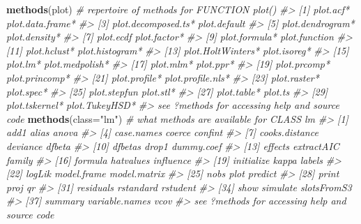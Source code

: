 \documentclass[
]{book}
\newenvironment{Shaded}{\begin{snugshade}}{\end{snugshade}}
\newcommand{\AttributeTok}[1]{\textcolor[rgb]{0.13,0.29,0.53}{#1}}
\newcommand{\CommentTok}[1]{\textcolor[rgb]{0.56,0.35,0.01}{\textit{#1}}}
\newcommand{\FunctionTok}[1]{\textcolor[rgb]{0.13,0.29,0.53}{\textbf{#1}}}
\newcommand{\NormalTok}[1]{#1}
\newcommand{\StringTok}[1]{\textcolor[rgb]{0.31,0.60,0.02}{#1}}
\begin{document}
\begin{Shaded}
\begin{Highlighting}[]
\FunctionTok{methods}\NormalTok{(plot) }\CommentTok{\# repertoire of methods for FUNCTION plot()}
\CommentTok{\#\textgreater{}  [1] plot.acf*           plot.data.frame*   }
\CommentTok{\#\textgreater{}  [3] plot.decomposed.ts* plot.default       }
\CommentTok{\#\textgreater{}  [5] plot.dendrogram*    plot.density*      }
\CommentTok{\#\textgreater{}  [7] plot.ecdf           plot.factor*       }
\CommentTok{\#\textgreater{}  [9] plot.formula*       plot.function      }
\CommentTok{\#\textgreater{} [11] plot.hclust*        plot.histogram*    }
\CommentTok{\#\textgreater{} [13] plot.HoltWinters*   plot.isoreg*       }
\CommentTok{\#\textgreater{} [15] plot.lm*            plot.medpolish*    }
\CommentTok{\#\textgreater{} [17] plot.mlm*           plot.ppr*          }
\CommentTok{\#\textgreater{} [19] plot.prcomp*        plot.princomp*     }
\CommentTok{\#\textgreater{} [21] plot.profile*       plot.profile.nls*  }
\CommentTok{\#\textgreater{} [23] plot.raster*        plot.spec*         }
\CommentTok{\#\textgreater{} [25] plot.stepfun        plot.stl*          }
\CommentTok{\#\textgreater{} [27] plot.table*         plot.ts            }
\CommentTok{\#\textgreater{} [29] plot.tskernel*      plot.TukeyHSD*     }
\CommentTok{\#\textgreater{} see \textquotesingle{}?methods\textquotesingle{} for accessing help and source code}
\FunctionTok{methods}\NormalTok{(}\AttributeTok{class=}\StringTok{"lm"}\NormalTok{)  }\CommentTok{\# what methods are available for CLASS lm}
\CommentTok{\#\textgreater{}  [1] add1           alias          anova         }
\CommentTok{\#\textgreater{}  [4] case.names     coerce         confint       }
\CommentTok{\#\textgreater{}  [7] cooks.distance deviance       dfbeta        }
\CommentTok{\#\textgreater{} [10] dfbetas        drop1          dummy.coef    }
\CommentTok{\#\textgreater{} [13] effects        extractAIC     family        }
\CommentTok{\#\textgreater{} [16] formula        hatvalues      influence     }
\CommentTok{\#\textgreater{} [19] initialize     kappa          labels        }
\CommentTok{\#\textgreater{} [22] logLik         model.frame    model.matrix  }
\CommentTok{\#\textgreater{} [25] nobs           plot           predict       }
\CommentTok{\#\textgreater{} [28] print          proj           qr            }
\CommentTok{\#\textgreater{} [31] residuals      rstandard      rstudent      }
\CommentTok{\#\textgreater{} [34] show           simulate       slotsFromS3   }
\CommentTok{\#\textgreater{} [37] summary        variable.names vcov          }
\CommentTok{\#\textgreater{} see \textquotesingle{}?methods\textquotesingle{} for accessing help and source code}
\end{Highlighting}
\end{Shaded}
\end{document}
